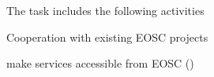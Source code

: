 \begin{task}[
  title=Collaboration with EOSC,
  id=eosc,
  lead=EGI,
  PM=33,
  wphases={12-48},
  partners={EGI,SRL,XFEL,WTT}
]
  The task includes the following activities

  \begin{compactitem}
  \item Cooperation with existing EOSC projects
  \item make services accessible from EOSC
    ()
  \end{compactitem}
\end{task}
